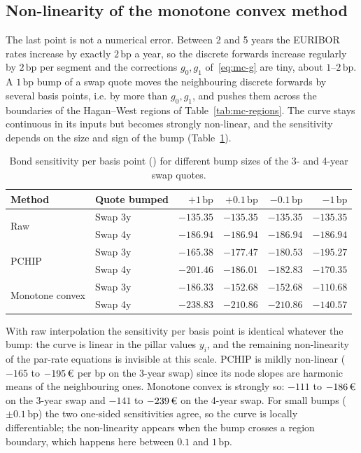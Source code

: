 \documentclass[11pt,a4paper]{article}
\theoremstyle{plain}
\theoremstyle{definition}
\newcommand{\bp}{\,\mathrm{bp}}
\newcommand{\eur}{\text{\texteuro}}
\begin{document}
\subsection{Non-linearity of the monotone convex method}
The last point is not a numerical error. Between 2 and 5 years the EURIBOR rates increase by exactly $2\bp$ a year, so the discrete forwards increase regularly by $2\bp$ per segment and the corrections $g_0,g_1$ of~\eqref{eq:mc-g} are tiny, about $1$--$2\bp$. A $1\bp$ bump of a swap quote moves the neighbouring discrete forwards by several basis points, i.e. by more than $g_0,g_1$, and pushes them across the boundaries of the Hagan--West regions of Table~\ref{tab:mc-regions}. The curve stays continuous in its inputs but becomes strongly non-linear, and the sensitivity depends on the size and sign of the bump (Table~\ref{tab:bumpsize}).

\begin{table}[htbp]
\centering
\small
\begin{tabular}{@{}llrrrr@{}}
\toprule
Method & Quote bumped & $+1\bp$ & $+0.1\bp$ & $-0.1\bp$ & $-1\bp$ \\
\midrule
\multirow{2}{*}{Raw} & Swap 3y & $-135.35$ & $-135.35$ & $-135.35$ & $-135.35$ \\
 & Swap 4y & $-186.94$ & $-186.94$ & $-186.94$ & $-186.94$ \\
\midrule
\multirow{2}{*}{PCHIP} & Swap 3y & $-165.38$ & $-177.47$ & $-180.53$ & $-195.27$ \\
 & Swap 4y & $-201.46$ & $-186.01$ & $-182.83$ & $-170.35$ \\
\midrule
\multirow{2}{*}{Monotone convex} & Swap 3y & $-186.33$ & $-152.68$ & $-152.68$ & $-110.68$ \\
 & Swap 4y & $-238.83$ & $-210.86$ & $-210.86$ & $-140.57$ \\
\bottomrule
\end{tabular}
\caption{Bond sensitivity per basis point (\eur) for different bump sizes of the 3- and 4-year swap quotes.}
\label{tab:bumpsize}
\end{table}

With raw interpolation the sensitivity per basis point is identical whatever the bump: the curve is linear in the pillar values $y_i$, and the remaining non-linearity of the par-rate equations is invisible at this scale. PCHIP is mildly non-linear ($-165$ to $-195\,\eur$ per bp on the 3-year swap) since its node slopes are harmonic means of the neighbouring ones. Monotone convex is strongly so: $-111$ to $-186\,\eur$ on the 3-year swap and $-141$ to $-239\,\eur$ on the 4-year swap. For small bumps ($\pm0.1\bp$) the two one-sided sensitivities agree, so the curve is locally differentiable; the non-linearity appears when the bump crosses a region boundary, which happens here between $0.1$ and $1\bp$.
\end{document}
